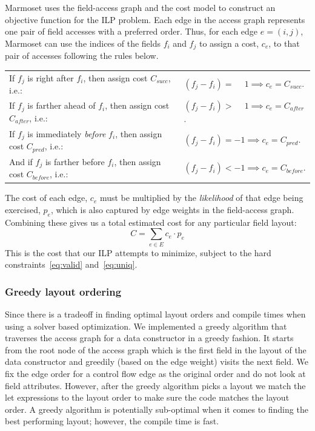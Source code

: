 \documentclass[acmsmall,review,anonymous]{acmart}\settopmatter{printfolios=true,printccs=false,printacmref=false}
\newcommand{\system}{{\sc Marmoset}\xspace}
\begin{document}
\system uses the field-access graph and the cost model to construct an objective function for the ILP problem.
Each edge in the access graph represents one pair of field accesses with a preferred order. Thus, for each edge $e = (i, j)$, \system can use the indices of the fields $f_i$ and $f_j$ to assign a cost, $c_e$, to that pair of accesses following the rules below.
\begin{table}[h]
\centering
\begin{tabular}{ll}
If $f_j$ is right after $f_i$, then assign cost $C_\mathit{succ}$, i.e.:
&
$
(f_j - f_i) = \phantom{-}1 \implies c_e = C_\mathit{succ}
$.
\\
If $f_j$ is farther ahead of $f_i$, then assign cost $C_\mathit{after}$, i.e.:
&
$
(f_j - f_i) > \phantom{-}1 \implies c_e = C_\mathit{after}
$.
\\
If $f_j$ is immediately {\em before} $f_i$, then assign cost $C_\mathit{pred}$, i.e.:
&
$
(f_j - f_i) = -1 \implies c_e = C_\mathit{pred}
$.
\\
And if $f_j$ is farther before $f_i$, then assign cost $C_\mathit{before}$, i.e.:
&
$
(f_j - f_i) < -1 \implies c_e = C_\mathit{before}
$.
\end{tabular}
\end{table}

The cost of each edge, $c_e$ must be multiplied by the {\em likelihood} of that edge being exercised, $p_e$, which is also captured by edge weights in the field-access graph. Combining these gives us a total estimated cost for any particular field layout:
\begin{equation}
C = \sum_{e \in E} c_e \cdot p_e
\label{eq:objective}
\end{equation}
This is the cost that our ILP attempts to minimize, subject to the hard constraints~\ref{eq:valid} and~\ref{eq:uniq}.

\subsubsection{Greedy layout ordering}

Since there is a tradeoff in finding optimal layout orders and compile times when using a solver based optimization. We implemented a greedy algorithm that traverses the access graph for a data constructor
in a greedy fashion. It starts from the root node of the access graph which is the first field in the layout of the data constructor and greedily (based on the edge weight) visits the next field. 
We fix the edge order for a control flow edge as the original order and do not look at field attributes. However, after the greedy algorithm picks a layout we match the let expressions to the layout order to make sure the code matches the layout order. A greedy algorithm is potentially sub-optimal when it comes to finding the best performing layout; however, the compile time is fast.
\end{document}
